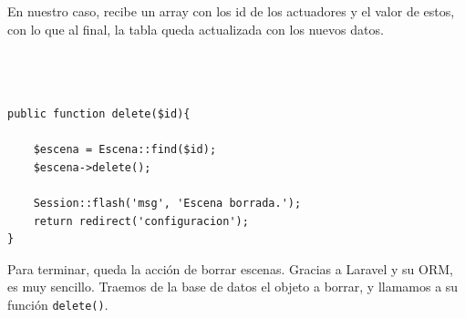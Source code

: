 En nuestro caso, recibe un array con los id de los actuadores y el valor de estos, con lo que al final, la tabla queda actualizada con los nuevos datos.



\begin{lstlisting}



public function delete($id){

    $escena = Escena::find($id);
    $escena->delete();

    Session::flash('msg', 'Escena borrada.');
    return redirect('configuracion');
}
   \end{lstlisting}
   
   Para terminar, queda la acción de borrar escenas. Gracias a Laravel y su ORM, es muy sencillo. Traemos de la base de datos el objeto a borrar, y llamamos a su función \lstinline|delete()|.
   
   
   
    
    
    
    
    
    
    
  
  
  
  
  
  
  
 
 









